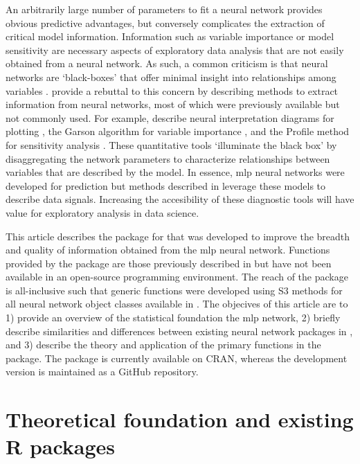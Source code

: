 \documentclass[article]{jss}\usepackage[]{graphicx}\usepackage[]{color}
\begin{document}
An arbitrarily large number of parameters to fit a neural network provides obvious predictive advantages, but conversely complicates the extraction of critical model information.  Information such as variable importance or model sensitivity are necessary aspects of exploratory data analysis that are not easily obtained from a neural network. As such, a common criticism is that neural networks are `black-boxes' that offer minimal insight into relationships among variables \citep[e.g.,][]{Paruelo97}.  \citet{Olden02} provide a rebuttal to this concern by describing methods to extract information from neural networks, most of which were previously available but not commonly used.  For example, \citet{Olden02} describe neural interpretation diagrams for plotting \citep{Ozesmi99}, the Garson algorithm for variable importance \citep{Garson91}, and the Profile method for sensitivity analysis \citep{Lek96}.  These quantitative tools `illuminate the black box' by disaggregating the network parameters to characterize relationships between variables that are described by the model.  In essence, \ac{mlp} neural networks were developed for prediction but methods described in \citep{Olden02} leverage these models to describe data signals.  Increasing the accesibility of these diagnostic tools will have value for exploratory analysis in data science.

This article describes the  package for  that was developed to improve the breadth and quality of information obtained from the \ac{mlp} neural network.  Functions provided by the package are those previously described in \citep{Olden02} but have not been available in an open-source programming environment.  The reach of the package is all-inclusive such that generic functions were developed using S3 methods for all neural network object classes available in .  The objecives of this article are to 1) provide an overview of the statistical foundation the \ac{mlp} network, 2) briefly describe similarities and differences between existing neural network packages in , and 3) describe the theory and application of the primary functions in the  package.  The package is currently available on CRAN, whereas the development version is maintained as a GitHub repository.  

\section[Theoretical foundation]{Theoretical foundation and existing R packages}
\end{document}
